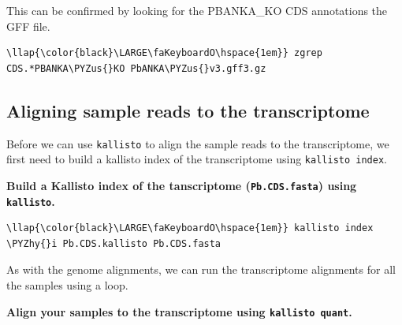 \documentclass[11pt]{article}
\def\PYZus{\char`\_}
\def\PYZhy{\char`\-}
\begin{document}
    This can be confirmed by looking for the PBANKA\_KO CDS annotations the
GFF file.

\begin{terminalinput}
\begin{Verbatim}[commandchars=\\\{\}]
\llap{\color{black}\LARGE\faKeyboardO\hspace{1em}} zgrep CDS.*PBANKA\PYZus{}KO PbANKA\PYZus{}v3.gff3.gz
\end{Verbatim}
\end{terminalinput}

    \subsection{Aligning sample reads to the
transcriptome}\label{aligning-sample-reads-to-the-transcriptome}

Before we can use \texttt{kallisto} to align the sample reads to the
transcriptome, we first need to build a kallisto index of the
transcriptome using \texttt{kallisto\ index}.

\textbf{Build a Kallisto index of the tanscriptome
(\texttt{Pb.CDS.fasta}) using \texttt{kallisto}.}

\begin{terminalinput}
\begin{Verbatim}[commandchars=\\\{\}]
\llap{\color{black}\LARGE\faKeyboardO\hspace{1em}} kallisto index \PYZhy{}i Pb.CDS.kallisto Pb.CDS.fasta
\end{Verbatim}
\end{terminalinput}


    As with the genome alignments, we can run the transcriptome alignments
for all the samples using a loop.

\textbf{Align your samples to the transcriptome using
\texttt{kallisto\ quant}.}
\end{document}
